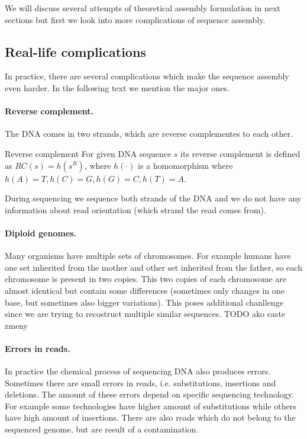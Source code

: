 We will discuss several attempts of theoretical assembly formulation in
next sections but first we look into more complications of sequence assembly.

\subsection{Real-life complications}

In practice, there are several complications which make the sequence assembly even harder.
In the following text we mention the major ones.

\paragraph{Reverse complement.} 
The DNA comes in two strands, which are reverse complementes to each other.

\begin{definition}{Reverse complement}
For given DNA sequence $s$ its reverse complement is defined as
$RC(s) = h(s^R)$, where $h(\cdot)$ is a homomorphism where $h(A) = T, h(C) = G,
h(G) = C, h(T) = A$. 
\end{definition}

During sequencing we sequence both strands of the DNA and we do not have
any information about read orientation (which strand the read comes from).

\paragraph{Diploid genomes.}
Many organisms have multiple sets of chromosomes. For example humans have one set
inherited from the mother and other set inherited from the father, so each chromosome
is present in two copies. This two copies of each chromosome are almost identical but
contain some differences (sometimes only changes in one base, but sometimes also
bigger variations). This poses additional chanllenge since we are trying to recostruct
multiple similar sequences.
TODO ako caste zmeny

\paragraph{Errors in reads.}
In practice the chemical process of sequencing DNA also produces errors.
Sometimes there are small errors in reads, i.e. substitutions, insertions
and deletions. The amount of these errors depend on specific sequencing technology.
For example some technologies have higher amount of substitutions while others
have high amount of insertions. 
There are also reads which do not belong to the sequenced genome, but are result
of a contamination.


